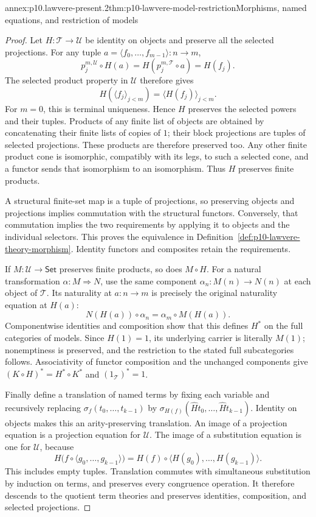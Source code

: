 \begin{annexitem}{annex:p10.lawvere-present.2}{thm:p10-lawvere-model-restriction}{Morphisms, named equations, and restriction of models}
\begin{proof}
Let \(H:\mathcal T\to\mathcal U\) be identity on objects and
preserve all the selected projections.
For any tuple \(a=\langle f_0,\ldots,f_{m-1}\rangle:n\to m\),
\[
 p_j^{m,\mathcal U}\circ H(a)
     =H(p_j^{m,\mathcal T}\circ a)=H(f_j).
\]
The selected product property in \(\mathcal U\) therefore gives
\[
                     H(\langle f_j\rangle_{j<m})
                                  =\langle H(f_j)\rangle_{j<m}.
\]
For \(m=0\), this is terminal uniqueness.  Hence \(H\)
preserves the selected powers and their tuples.
Products of any finite list of objects are obtained by
concatenating their finite lists of copies of \(1\);
their block projections are tuples of selected projections.
These products are therefore preserved too.
Any other finite product cone is isomorphic, compatibly
with its legs, to such a selected cone, and a functor sends
that isomorphism to an isomorphism.  Thus \(H\) preserves
finite products.

A structural finite-set map is a tuple of projections, so
preserving objects and projections implies commutation with
the structural functors.  Conversely, that commutation
implies the two requirements by applying it to objects and
the individual selectors.  This proves the equivalence in
Definition~\ref{def:p10-lawvere-theory-morphism}.
Identity functors and composites retain the requirements.

If \(M:\mathcal U\to\mathsf{Set}\) preserves finite products,
so does \(M\circ H\).  For a natural transformation
\(\alpha:M\Rightarrow N\), use the same component
\(\alpha_n:M(n)\to N(n)\) at each object of \(\mathcal T\).
Its naturality at \(a:n\to m\) is precisely the original
naturality equation at \(H(a)\):
\[
                    N(H(a))\circ\alpha_n
                              =\alpha_m\circ M(H(a)).
\]
Componentwise identities and composition show that this
defines \(H^*\) on the full categories of models.
Since \(H(1)=1\), its underlying carrier is literally \(M(1)\);
nonemptiness is preserved, and the restriction to the stated
full subcategories follows.
Associativity of functor composition and the unchanged
components give
\((K\circ H)^*=H^*\circ K^*\) and \((1_{\mathcal T})^*=1\).

Finally define a translation of named terms by fixing each
variable and recursively replacing
\(\sigma_f(t_0,\ldots,t_{k-1})\) by
\(\sigma_{H(f)}(\widehat Ht_0,\ldots,\widehat Ht_{k-1})\).
Identity on objects makes this an arity-preserving translation.
An image of a projection equation is a projection equation
for \(\mathcal U\).
The image of a substitution equation is one for \(\mathcal U\),
because
\[
 H\bigl(f\circ\langle g_0,\ldots,g_{k-1}\rangle\bigr)
           =H(f)\circ\langle H(g_0),\ldots,H(g_{k-1})\rangle.
\]
This includes empty tuples.
Translation commutes with simultaneous substitution by
induction on terms, and preserves every congruence operation.
It therefore descends to the quotient term theories and
preserves identities, composition, and selected projections.


\end{proof}
\end{annexitem}
